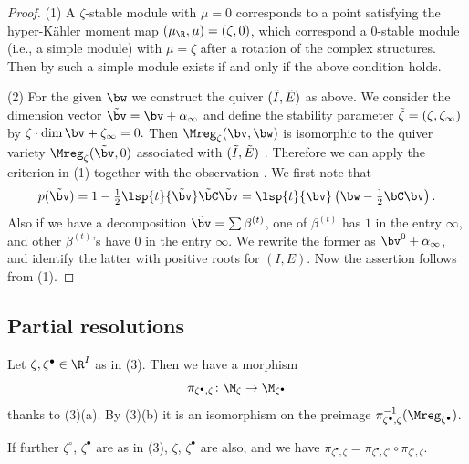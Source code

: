 \begin{proof}
(1) A $\zeta$-stable module with $\mu = 0$ corresponds to a point
satisfying the hyper-K\"ahler moment map $(\mu_\R,\mu) = (\zeta,0)$,
which correspond a $0$-stable module (i.e., a simple module) with $\mu
= \zeta$ after a rotation of the complex structures. Then by
\cite[Theorem~1.2]{CB} such a simple module exists if and only if the
above condition holds.

(2) For the given $\bw$ we construct the quiver $(\Tilde{I},\Tilde{E})$ as
above. We consider the dimension vector $\Tilde{\bv} = \bv + \alpha_\infty$
and def\/ine the stability parameter $\Tilde{\zeta} = (\zeta,\zeta_\infty)$ by
\(
\zeta\cdot \dim \bv + \zeta_\infty = 0.
\)
Then $\Mreg_\zeta(\bv,\bw)$ is isomorphic to the quiver variety
$\Mreg_{\Tilde{\zeta}}(\Tilde{\bv},0)$ associated with
$(\Tilde{I},\Tilde{E})$ \cite[the end of Introduction]{CB}.
%
Therefore we can apply the criterion in (1) together with the
observation . We f\/irst note that
\[
  p(\Tilde{\bv}) = 1 - \tfrac12 \lsp{t}{\Tilde{\bv}} \Tilde{\bC} \Tilde{\bv}
  = \lsp{t}{\bv}\left(\bw - \tfrac12 \bC \bv\right).
\]
Also if we have a decomposition $\Tilde{\bv} = \sum \beta^{(t)}$, one
of $\beta^{(t)}$ has $1$ in the entry $\infty$, and other
$\beta^{(t)}$'s have $0$ in the entry $\infty$. We rewrite the former
as $\bv^0 + \alpha_\infty$, and identify the latter with positive
roots for $(I,E)$. Now the assertion follows from (1).
\end{proof}

\subsection{Partial resolutions}\label{subsec:partial}

Let $\zeta,\zeta^\bullet\in\R^I$ as in (3). Then we have a
morphism
\begin{equation*}
   \pi_{\zeta^\bullet,\zeta} \colon \M_\zeta \to \M_{\zeta^\bullet}
\end{equation*}
thanks to (3)(a). By (3)(b) it is an
isomorphism on the preimage $\pi_{\zeta^\bullet,\zeta}^{-1}(\Mreg_{\zeta^\bullet})$.

If further $\zeta^\circ$, $\zeta^\bullet$ are as in (3),
$\zeta$, $\zeta^\bullet$ are also, and we have
\(
  \pi_{\zeta^\bullet,\zeta} = \pi_{\zeta^\bullet,\zeta^\circ}
  \circ \pi_{\zeta^\circ,\zeta}.
\)

